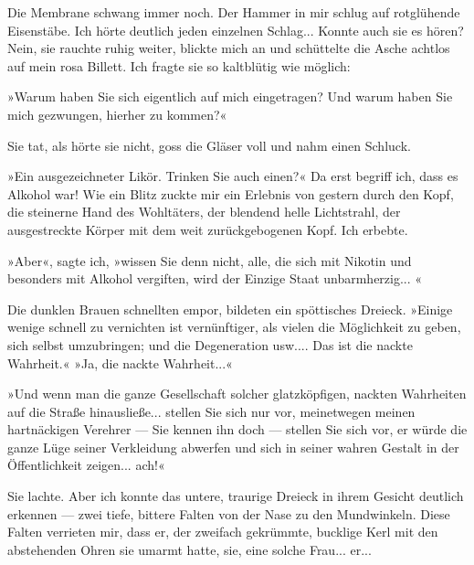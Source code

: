 Die Membrane schwang immer noch. Der Hammer in mir schlug auf
rotglühende Eisenstäbe. Ich hörte deutlich jeden einzelnen
Schlag... Konnte auch sie es hören? Nein, sie rauchte ruhig weiter,
blickte mich an und schüttelte die Asche achtlos auf mein rosa
Billett. Ich fragte sie so kaltblütig wie möglich:

»Warum haben Sie sich eigentlich auf mich eingetragen? Und warum
haben Sie mich gezwungen, hierher zu kommen?«

Sie tat, als hörte sie nicht, goss die Gläser voll und nahm einen
Schluck.

»Ein ausgezeichneter Likör. Trinken Sie auch einen?« Da erst
begriff ich, dass es Alkohol war! Wie ein Blitz zuckte mir ein
Erlebnis von gestern durch den Kopf, die steinerne Hand des
Wohltäters, der blendend helle Lichtstrahl, der ausgestreckte
Körper mit dem weit zurückgebogenen Kopf. Ich erbebte.

»Aber«, sagte ich, »wissen Sie denn nicht, alle, die sich mit
Nikotin und besonders mit Alkohol vergiften, wird der Einzige Staat
unbarmherzig... «

Die dunklen Brauen schnellten empor, bildeten ein spöttisches
Dreieck. »Einige wenige schnell zu vernichten ist vernünftiger, als
vielen die Möglichkeit zu geben, sich selbst umzubringen; und die
Degeneration usw.... Das ist die nackte Wahrheit.« »Ja, die nackte
Wahrheit...«

»Und wenn man die ganze Gesellschaft solcher glatzköpfigen, nackten
Wahrheiten auf die Straße hinausließe... stellen Sie sich nur vor,
meinetwegen meinen hartnäckigen Verehrer — Sie kennen ihn doch —
stellen Sie sich vor, er würde die ganze Lüge seiner Verkleidung
abwerfen und sich in seiner wahren Gestalt in der Öffentlichkeit
zeigen... ach!«

Sie lachte. Aber ich konnte das untere, traurige Dreieck in ihrem
Gesicht deutlich erkennen — zwei tiefe, bittere Falten von der Nase
zu den Mundwinkeln. Diese Falten verrieten mir, dass er, der
zweifach gekrümmte, bucklige Kerl mit den abstehenden Ohren sie
umarmt hatte, sie, eine solche Frau... er...

